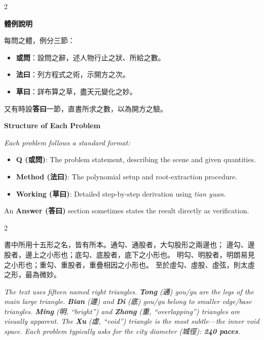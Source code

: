 \documentclass[11pt,a4paper]{article}
\newcommand{\cnpar}[1]{{\tradfont #1\par}}
\newcommand{\enpar}[1]{{\itshape #1\par}}
\begin{document}
\vspace{0.5cm}
\begin{paracol}{2}

\noindent\textbf{\tradfont 體例說明}

\cnpar{%
每問之體，例分三節：
\begin{itemize}[leftmargin=2em]
  \item \textbf{或問}：設問之辭，述人物行止之狀、所給之數。
  \item \textbf{法曰}：列方程式之術，示開方之次。
  \item \textbf{草曰}：詳布算之草，盡天元變化之妙。
\end{itemize}
又有時設\textbf{答曰}一節，直書所求之數，以為開方之驗。}

\switchcolumn

\noindent\textbf{Structure of Each Problem}

\enpar{%
Each problem follows a standard format:
\begin{itemize}[leftmargin=2em]
  \item \textbf{Q (或問)}: The problem statement, describing the scene and given quantities.
  \item \textbf{Method (法曰)}: The polynomial setup and root-extraction procedure.
  \item \textbf{Working (草曰)}: Detailed step-by-step derivation using \textit{tian yuan}.
\end{itemize}
An \textbf{Answer (答曰)} section sometimes states the result directly as verification.}

\end{paracol}

\vspace{0.5cm}
\begin{paracol}{2}

\cnpar{%
書中所用十五形之名，皆有所本。通勾、通股者，大勾股形之兩邊也；
邊勾、邊股者，邊上之小形也；底勾、底股者，底下之小形也。
明勾、明股者，明朗易見之小形也；重勾、重股者，重疊相因之小形也。
至於虛勾、虛股、虛弦，則太虛之形，最為微妙。}

\switchcolumn

\enpar{%
The text uses fifteen named right triangles. \textbf{Tong} (通) gou/gu are the legs of the main
large triangle. \textbf{Bian} (邊) and \textbf{Di} (底) gou/gu belong to smaller edge/base triangles.
\textbf{Ming} (明, ``bright'') and \textbf{Zhong} (重, ``overlapping'') triangles are visually
apparent. The \textbf{Xu} (虛, ``void'') triangle is the most subtle---the inner void space.
Each problem typically asks for the city diameter (城徑): \textbf{240 paces}.}

\end{paracol}
\end{document}
